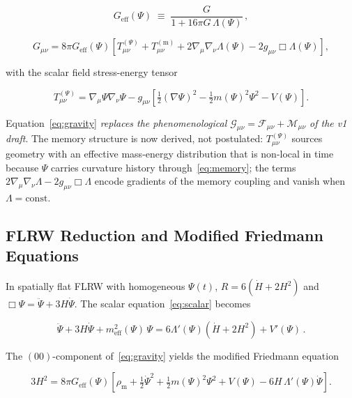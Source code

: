 \documentclass[12pt,a4paper]{article}
\begin{document}
\begin{equation}
\label{eq:Geff_def}
G_{\mathrm{eff}}(\Psi) \;\equiv\; \frac{G}{1 + 16\pi G\,\Lambda(\Psi)}\,,
\end{equation}

\begin{equation}
\label{eq:gravity}
\boxed{
G_{\mu\nu} = 8\pi G_{\mathrm{eff}}(\Psi)
\!\left[
  T^{(\Psi)}_{\mu\nu} + T^{(\mathrm{m})}_{\mu\nu}
  + 2\nabla_\mu\nabla_\nu\Lambda(\Psi)
  - 2g_{\mu\nu}\Box\Lambda(\Psi)
\right],
}
\end{equation}

with the scalar field stress-energy tensor

\begin{equation}
\label{eq:Tpsi}
T^{(\Psi)}_{\mu\nu}
= \nabla_\mu\Psi\nabla_\nu\Psi
  - g_{\mu\nu}\!\left[
    \tfrac{1}{2}(\nabla\Psi)^2
    - \tfrac{1}{2}m(\Psi)^2\Psi^2 - V(\Psi)
  \right].
\end{equation}

Equation~\eqref{eq:gravity} \emph{replaces the phenomenological
$\mathcal{G}_{\mu\nu} = \mathcal{F}_{\mu\nu} + \mathcal{M}_{\mu\nu}$
of the v1 draft}. The memory structure is now derived, not postulated:
$T^{(\Psi)}_{\mu\nu}$ sources geometry with an effective mass-energy
distribution that is non-local in time because $\Psi$ carries curvature
history through~\eqref{eq:memory}; the terms
$2\nabla_\mu\nabla_\nu\Lambda - 2g_{\mu\nu}\Box\Lambda$ encode gradients
of the memory coupling and vanish when $\Lambda = \mathrm{const}$.

\subsection{FLRW Reduction and Modified Friedmann Equations}
\label{sec:flrw}

In spatially flat FLRW with homogeneous $\Psi(t)$,
$R = 6(\dot{H} + 2H^2)$ and $\Box\Psi = \ddot\Psi + 3H\dot\Psi$.
The scalar equation~\eqref{eq:scalar} becomes

\begin{equation}
\label{eq:flrw_scalar}
\ddot\Psi + 3H\dot\Psi + m_{\mathrm{eff}}^2(\Psi)\,\Psi
= 6\Lambda'(\Psi)\!\left(\dot{H} + 2H^2\right) + V'(\Psi)\,.
\end{equation}

The $(00)$-component of~\eqref{eq:gravity} yields the modified Friedmann equation

\begin{equation}
\label{eq:friedmann}
\boxed{
3H^2 = 8\pi G_{\mathrm{eff}}(\Psi)
\!\left[
  \rho_{\mathrm{m}}
  + \tfrac{1}{2}\dot\Psi^2
  + \tfrac{1}{2}m(\Psi)^2\Psi^2
  + V(\Psi)
  - 6H\,\Lambda'(\Psi)\dot\Psi
\right].
}
\end{equation}
\end{document}
